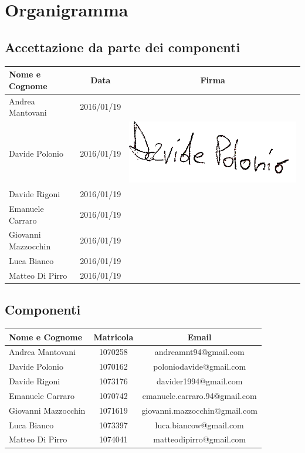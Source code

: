 \section*{Organigramma} %
\subsection*{Accettazione da parte dei componenti}
\begin{center}
  \begin{tabular}{ l | c | c }
    \hline
    \textbf{Nome e Cognome} & \textbf{Data} & \textbf{Firma} \\
    \hline
    Andrea Mantovani & 2016/01/19 &   \\ \hline
    Davide Polonio & 2016/01/19 &  \includegraphics{res/img/organigramma/DavidePolonio} \\ \hline
    Davide Rigoni & 2016/01/19 &  \\ \hline
    Emanuele Carraro & 2016/01/19 &  \\ \hline
    Giovanni Mazzocchin & 2016/01/19 &  \\ \hline
    Luca Bianco & 2016/01/19 &  \\ \hline
    Matteo Di Pirro & 2016/01/19 &  \\
    \hline
  \end{tabular}
\end{center}


\subsection*{Componenti}
\begin{center}
  \begin{tabular}{ l | c | c }
    \hline
    \textbf{Nome e Cognome} & \textbf{Matricola} & \textbf{Email} \\
    \hline
    Andrea Mantovani & 1070258 & andreamnt94@gmail.com \\ \hline
    Davide Polonio & 1070162 & poloniodavide@gmail.com \\ \hline
    Davide Rigoni & 1073176 & davider1994@gmail.com \\ \hline
    Emanuele Carraro & 1070742 & emanuele.carraro.94@gmail.com \\ \hline
    Giovanni Mazzocchin & 1071619 & giovanni.mazzocchin@gmail.com \\ \hline
    Luca Bianco & 1073397 & luca.biancow@gmail.com \\ \hline
    Matteo Di Pirro & 1074041 & matteodipirro@gmail.com \\
    \hline
  \end{tabular}
\end{center}



